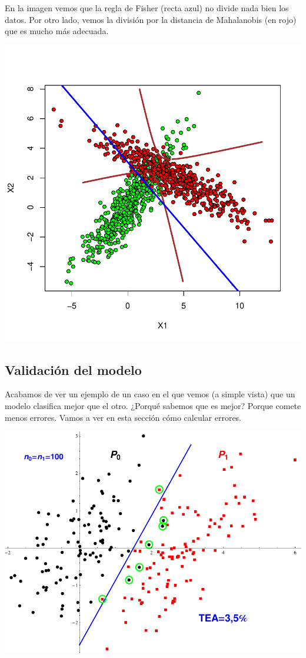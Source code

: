 En la imagen vemos que la regla de Fisher (recta azul) no divide nada bien los datos. Por otro lado, vemos la división por la distancia de Mahalanobis (en rojo) que es mucho más adecuada.

\begin{center}
\includegraphics[width=13 cm]{pdf/tema4/_sim-plot-reglas}
\end{center}


\subsection{Validación del modelo}

Acabamos de ver un ejemplo de un caso en el que vemos (a simple vista) que un modelo clasifica mejor que el otro. ¿Porqué sabemos que es mejor? Porque comete menos errores. Vamos a ver en esta sección cómo calcular errores.

\centerline{{\includegraphics[width=13 cm]{pdf/tema4/_errores-1}}}

